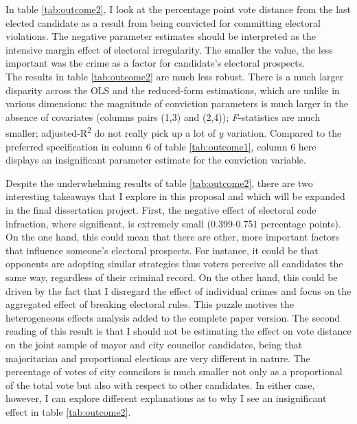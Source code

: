 \documentclass[11pt]{article}
\begin{document}
In table \ref{tab:outcome2}, I look at the percentage point vote distance from the last elected candidate as a result from being convicted for committing electoral violations. The negative parameter estimates should be interpreted as the intensive margin effect of electoral irregularity. The smaller the value, the less important was the crime as a factor for candidate's electoral prospects. \\



The results in table \ref{tab:outcome2} are much less robust. There is a much larger disparity across the OLS and the reduced-form estimations, which are unlike in various dimensions: the magnitude of conviction parameters is much larger in the absence of covariates (columns pairs (1,3) and (2,4)); \emph{F}-statistics are much smaller; adjusted-R\textsuperscript{2} do not really pick up a lot of $y$ variation. Compared to the preferred specification in column 6 of table \ref{tab:outcome1}, column 6 here displays an insignificant parameter estimate for the conviction variable.

Despite the underwhelming results of table \ref{tab:outcome2}, there are two interesting takeaways that I explore in this proposal and which will be expanded in the final dissertation project. First, the negative effect of electoral code infraction, where significant, is extremely small (0.399-0.751 percentage points). On the one hand, this could mean that there are other, more important factors that influence someone's electoral prospects. For instance, it could be that opponents are adopting similar strategies thus voters perceive all candidates the same way, regardless of their criminal record. On the other hand, this could be driven by the fact that I disregard the effect of individual crimes and focus on the aggregated effect of breaking electoral rules. This puzzle motives the heterogeneous effects analysis added to the complete paper version. The second reading of this result is that I should not be estimating the effect on vote distance on the joint sample of mayor and city councilor candidates, being that majoritarian and proportional elections are very different in nature. The percentage of votes of city councilors is much smaller not only as a proportional of the total vote but also with respect to other candidates. In either case, however, I can explore different explanations as to why I see an insignificant effect in table \ref{tab:outcome2}.


\end{document}
